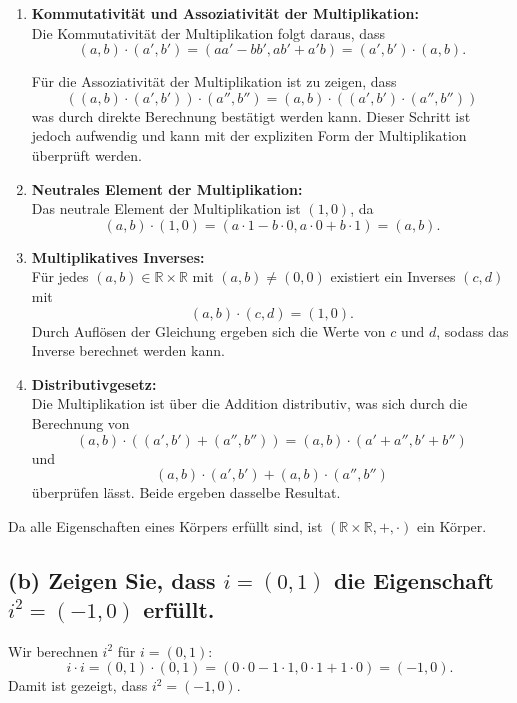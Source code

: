 \documentclass[11pt]{article}
\begin{document}
\begin{enumerate}
   \item \textbf{Kommutativität und Assoziativität der Multiplikation:} \\
   Die Kommutativität der Multiplikation folgt daraus, dass
   \[
   (a, b) \cdot (a', b') = (aa' - bb', ab' + a'b) = (a', b') \cdot (a, b).
   \]

   Für die Assoziativität der Multiplikation ist zu zeigen, dass
   \[
   ((a, b) \cdot (a', b')) \cdot (a'', b'') = (a, b) \cdot ((a', b') \cdot (a'', b''))
   \]
   was durch direkte Berechnung bestätigt werden kann. Dieser Schritt ist jedoch aufwendig und kann mit der expliziten Form der Multiplikation überprüft werden.

   \item \textbf{Neutrales Element der Multiplikation:} \\
   Das neutrale Element der Multiplikation ist \( (1, 0) \), da
   \[
   (a, b) \cdot (1, 0) = (a \cdot 1 - b \cdot 0, a \cdot 0 + b \cdot 1) = (a, b).
   \]

   \item \textbf{Multiplikatives Inverses:} \\
   Für jedes \( (a, b) \in \mathbb{R} \times \mathbb{R} \) mit \( (a, b) \neq (0, 0) \) existiert ein Inverses \( (c, d) \) mit
   \[
   (a, b) \cdot (c, d) = (1, 0).
   \]
   Durch Auflösen der Gleichung ergeben sich die Werte von \( c \) und \( d \), sodass das Inverse berechnet werden kann.

   \item \textbf{Distributivgesetz:} \\
   Die Multiplikation ist über die Addition distributiv, was sich durch die Berechnung von
   \[
   (a, b) \cdot ((a', b') + (a'', b'')) = (a, b) \cdot (a' + a'', b' + b'')
   \]
   und
   \[
   (a, b) \cdot (a', b') + (a, b) \cdot (a'', b'')
   \]
   überprüfen lässt. Beide ergeben dasselbe Resultat.
\end{enumerate}
Da alle Eigenschaften eines Körpers erfüllt sind, ist \( (\mathbb{R} \times \mathbb{R}, +, \cdot) \) ein Körper.

\subsection*{(b) Zeigen Sie, dass \( i = (0, 1) \) die Eigenschaft \( i^2 = (-1, 0) \) erfüllt.}

Wir berechnen \( i^2 \) für \( i = (0, 1) \):
\[
i \cdot i = (0, 1) \cdot (0, 1) = (0 \cdot 0 - 1 \cdot 1, 0 \cdot 1 + 1 \cdot 0) = (-1, 0).
\]
Damit ist gezeigt, dass \( i^2 = (-1, 0) \).
\end{document}
